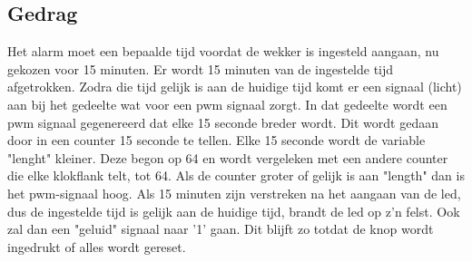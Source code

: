 \subsection{Gedrag}
Het alarm moet een bepaalde tijd voordat de wekker is ingesteld aangaan, nu gekozen voor 15 minuten.
Er wordt 15 minuten van de ingestelde tijd afgetrokken. Zodra die tijd gelijk is aan de huidige tijd komt er een signaal (licht) aan bij het gedeelte wat voor een pwm signaal zorgt.
In dat gedeelte wordt een pwm signaal gegenereerd dat elke 15 seconde breder wordt. Dit wordt gedaan door in een counter 15 seconde te tellen. Elke 15 seconde wordt de variable "lenght" kleiner. Deze begon op 64 en wordt vergeleken met een andere counter die elke klokflank telt, tot 64. Als de counter groter of gelijk is aan "length" dan is het pwm-signaal hoog. 
Als 15 minuten zijn verstreken na het aangaan van de led, dus de ingestelde tijd is gelijk aan de huidige tijd, brandt de led op z'n felst. Ook zal dan een "geluid" signaal naar '1' gaan. Dit blijft zo totdat de knop wordt ingedrukt of alles wordt gereset.

